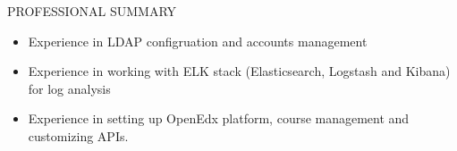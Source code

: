 \documentclass{resume} %
\begin{document}
\begin{rSection}{PROFESSIONAL SUMMARY}
\begin{itemize}
  \item Experience in LDAP configruation and accounts
    management
    
  \item Experience in working with ELK stack (Elasticsearch,
    Logstash and Kibana) for log analysis
    
  \item Experience in setting up OpenEdx platform, course
    management and customizing APIs.

  \end{itemize}

\end{rSection}

\end{document}
